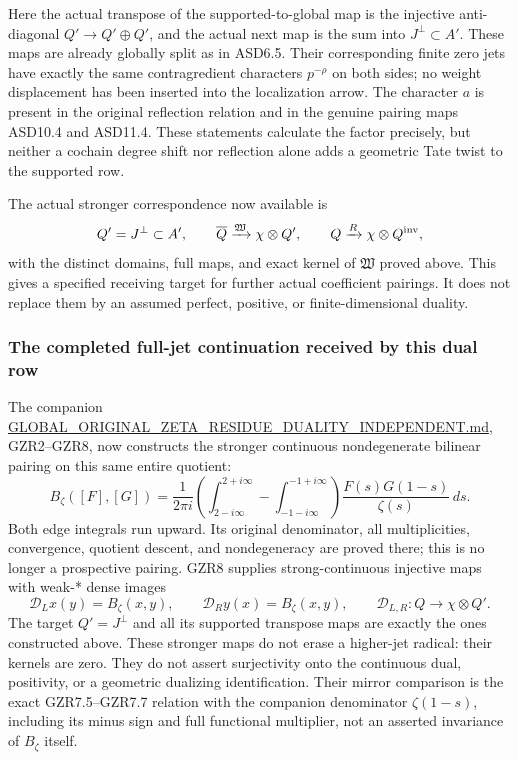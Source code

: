 Here the actual transpose of the supported-to-global map is the
injective anti-diagonal \(Q'\to Q'\oplus Q'\), and the actual next map
is the sum into \(J^\perp\subset A'\). These maps are already globally
split as in ASD6.5. Their corresponding finite zero jets have exactly
the same contragredient characters \(p^{-\rho}\) on both sides; no
weight displacement has been inserted into the localization arrow. The
character \(a\) is present in the original reflection relation and in
the genuine pairing maps ASD10.4 and ASD11.4. These statements calculate
the factor precisely, but neither a cochain degree shift nor reflection
alone adds a geometric Tate twist to the supported row.

The actual stronger correspondence now available is \[
 Q'=J^\perp\subset A',
 \qquad
 \overline Q\xrightarrow{\mathfrak W}\chi\otimes Q',
 \qquad
 Q\xrightarrow{R}\chi\otimes Q^{\rm inv},
\] with the distinct domains, full maps, and exact kernel of
\(\mathfrak W\) proved above. This gives a specified receiving target
for further actual coefficient pairings. It does not replace them by an
assumed perfect, positive, or finite-dimensional duality.

\subsubsection{The completed full-jet continuation received by this dual
row}\label{the-completed-full-jet-continuation-received-by-this-dual-row}

The companion \url{GLOBAL_ORIGINAL_ZETA_RESIDUE_DUALITY_INDEPENDENT.md},
GZR2--GZR8, now constructs the stronger continuous nondegenerate
bilinear pairing on this same entire quotient: \[
 B_\zeta([F],[G])=\frac1{2\pi i}
 \left(\int_{2-i\infty}^{2+i\infty}
       -\int_{-1-i\infty}^{-1+i\infty}\right)
 \frac{F(s)G(1-s)}{\zeta(s)}\,ds.
 \tag{ASD13.1}
\] Both edge integrals run upward. Its original denominator, all
multiplicities, convergence, quotient descent, and nondegeneracy are
proved there; this is no longer a prospective pairing. GZR8 supplies
strong-continuous injective maps with weak-* dense images \[
 \mathcal D_Lx(y)=B_\zeta(x,y),\qquad
 \mathcal D_Ry(x)=B_\zeta(x,y),\qquad
 \mathcal D_{L,R}:Q\longrightarrow\chi\otimes Q'.
 \tag{ASD13.2}
\] The target \(Q'=J^\perp\) and all its supported transpose maps are
exactly the ones constructed above. These stronger maps do not erase a
higher-jet radical: their kernels are zero. They do not assert
surjectivity onto the continuous dual, positivity, or a geometric
dualizing identification. Their mirror comparison is the exact
GZR7.5--GZR7.7 relation with the companion denominator \(\zeta(1-s)\),
including its minus sign and full functional multiplier, not an asserted
invariance of \(B_\zeta\) itself.

